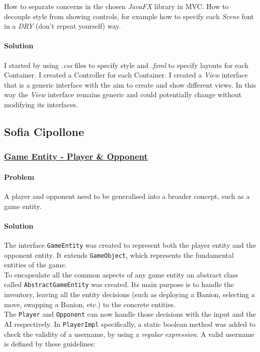\documentclass[12pt, a4paper]{report}
\theoremstyle{definition}
\begin{document}
            How to separate concerns in the chosen \emph{JavaFX} library in MVC.
            How to decouple style from showing controls, for example how to specify each \emph{Scene} font in a \emph{DRY} (don't repeat yourself) way.

            \paragraph{Solution}

            I started by using \textit{.css} files to specify style and \textit{.fxml} to specify layouts for each Container.
            I created a Controller for each Container.
            I created a \textit{View} interface that is a generic interface with the aim to create and show different views.
            In this way the \textit{View} interface remains generic and could potentially change without modifying its interfaces.

    \pagebreak

    \subsection*{Sofia Cipollone}

    \subsubsection{\underline{Game Entity - Player \& Opponent}}
    \paragraph{Problem}
    A player and opponent need to be generalised into a broader concept, such as a game entity.
    \paragraph{Solution}
    The interface \verb|GameEntity| was created to represent both the player entity and the opponent entity.
    It extends \verb|GameObject|, which represents the fundamental entities of the game.\\
    To encapsulate all the common aspects of any game entity an abstract class called \verb|AbstractGameEntity| was created. Its main purpose is to handle the inventory, leaving all the
    entity decisions (such as deploying a Banion, selecting a move, swapping a Banion, etc.) to the concrete entities.\\
    The \verb|Player| and \verb|Opponent| can now handle those decisions with the input and the AI respectively.
    In \verb|PlayerImpl| specifically, a static boolean method was added to check the validity of a username, by using a \textit{regular expression}.
    A valid username is defined by these guidelines:
\end{document}
